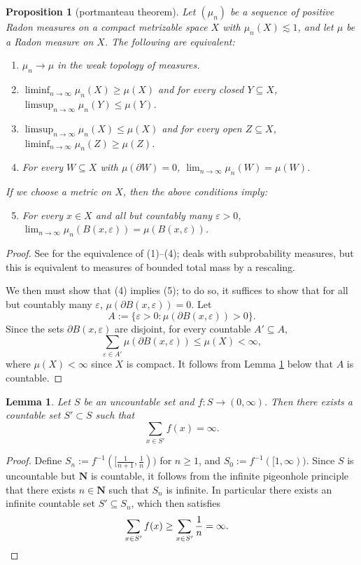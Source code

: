 \documentclass[reqno,11pt]{amsart}
\newcommand{\NN}{\mathbf{N}}
\newtheorem{lemma}[theorem]{Lemma}
\newtheorem{proposition}[theorem]{Proposition}
\theoremstyle{definition}
\numberwithin{equation}{section}
\begin{document}
\begin{proposition}[portmanteau theorem]
	Let $(\mu_n)$ be a sequence of positive Radon measures on a compact metrizable space $X$ with $\mu_n(X) \lesssim 1$, and let $\mu$ be a Radon measure on $X$. The following are equivalent:
\begin{enumerate}
	\item $\mu_n \to \mu$ in the weak topology of measures.
	\item $\liminf_{n \to \infty} \mu_n(X) \geq \mu(X)$ and for every closed $Y \subseteq X$, $\limsup_{n \to \infty} \mu_n(Y) \leq \mu(Y)$.
	\item $\limsup_{n \to \infty} \mu_n(X) \leq \mu(X)$ and for every open $Z \subseteq X$, $\liminf_{n \to \infty} \mu_n(Z) \geq \mu(Z)$.
	\item For every $W \subseteq X$ with $\mu(\partial W) = 0$, $\lim_{n \to \infty} \mu_n(W) = \mu(W)$.
\end{enumerate}
	If we choose a metric on $X$, then the above conditions imply:
\begin{enumerate}
	\setcounter{enumi}{4}
	\item For every $x \in X$ and all but countably many $\varepsilon > 0$, $\lim_{n \to \infty} \mu_n(B(x, \varepsilon)) = \mu(B(x, \varepsilon))$.
\end{enumerate}
\end{proposition}
\begin{proof}
	See \cite[Theorem 13.16]{klenke2013probability} for the equivalence of (1)--(4); \cite{klenke2013probability} deals with subprobability measures, but this is equivalent to measures of bounded total mass by a rescaling.

	We then must show that (4) implies (5); to do so, it suffices to show that for all but countably many $\varepsilon$, $\mu(\partial B(x, \varepsilon)) = 0$.
	Let
	$$A := \{\varepsilon > 0: \mu(\partial B(x, \varepsilon)) > 0\}.$$
	Since the sets $\partial B(x, \varepsilon)$ are disjoint, for every countable $A' \subseteq A$,
	$$\sum_{\varepsilon \in A'} \mu(\partial B(x, \varepsilon)) \leq \mu(X) < \infty,$$
	where $\mu(X) < \infty$ since $X$ is compact.
	It follows from Lemma \ref{cardinality appendix} below that $A$ is countable.
\end{proof}

\begin{lemma}\label{cardinality appendix}
Let $S$ be an uncountable set and $f: S \to (0, \infty)$. Then there exists a countable set $S' \subset S$ such that
$$\sum_{x \in S'} f(x) = \infty.$$
\end{lemma}
\begin{proof}
Define $S_n := f^{-1}([\frac{1}{n + 1}, \frac{1}{n}))$ for $n \geq 1$, and $S_0 := f^{-1}([1, \infty))$.
Since $S$ is uncountable but $\NN$ is countable, it follows from the infinite pigeonhole principle that there exists $n \in \NN$ such that $S_n$ is infinite.
In particular there exists an infinite countable set $S' \subseteq S_n$, which then satisfies
\begin{align*}
\sum_{x \in S'} f(x) &\geq \sum_{x \in S'} \frac{1}{n} = \infty. \qedhere 
\end{align*}
\end{proof}
\end{document}
